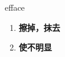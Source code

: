 
\begin{frame}
{\huge efface}
\begin{center}
\begin{enumerate}\Large
  \item \textbf{擦掉，抹去}
  \item \textbf{使不明显}
\end{enumerate}
\end{center}
\end{frame}
